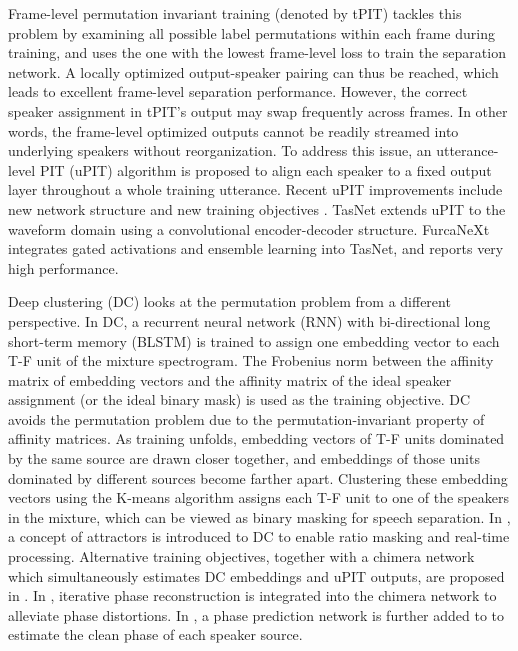 \documentclass[journal]{IEEEtran}
\begin{document}
Frame-level permutation invariant training (denoted by tPIT) \cite{PIT} tackles this problem by examining all possible label permutations within each frame during training, and uses the one with the lowest frame-level loss to train the separation network.
A locally optimized output-speaker pairing can thus be reached, which leads to excellent frame-level separation performance.
However, the correct speaker assignment in tPIT's output may swap frequently across frames.
In other words, the frame-level optimized outputs cannot be readily streamed into underlying speakers without reorganization. 
To address this issue, an utterance-level PIT (uPIT) algorithm \cite{PIT} is proposed to align each speaker to a fixed output layer throughout a whole training utterance.
Recent uPIT improvements include new network structure \cite{CBLDNN} \cite{grid} and new training objectives \cite{CBLDNN}.
TasNet \cite{Tasnet} extends uPIT to the waveform domain using a convolutional encoder-decoder structure.
FurcaNeXt \cite{Furca} integrates gated activations and ensemble learning into TasNet, and reports very high performance.

Deep clustering (DC) \cite{DC} looks at the permutation problem from a different perspective.
In DC, a recurrent neural network (RNN) with bi-directional long short-term memory (BLSTM) is trained to assign one embedding vector to each T-F unit of the mixture spectrogram.
The Frobenius norm between the affinity matrix of embedding vectors and the affinity matrix of the ideal speaker assignment (or the ideal binary mask) is used as the training objective.
DC avoids the permutation problem due to the permutation-invariant property of affinity matrices.
As training unfolds, embedding vectors of T-F units dominated by the same source are drawn closer together, and embeddings of those units dominated by different sources become farther apart.
Clustering these embedding vectors using the K-means algorithm assigns each T-F unit to one of the speakers in the mixture, which can be viewed as binary masking for speech separation.
In \cite{DAN}, a concept of attractors is introduced to DC to enable ratio masking and real-time processing.
Alternative training objectives, together with a chimera network which simultaneously estimates DC embeddings and uPIT outputs, are proposed in \cite{alter}.
In \cite{end2end}, iterative phase reconstruction is integrated into the chimera network to alleviate phase distortions.
In \cite{tri}, a phase prediction network is further added to \cite{end2end} to estimate the clean phase of each speaker source.
\end{document}
